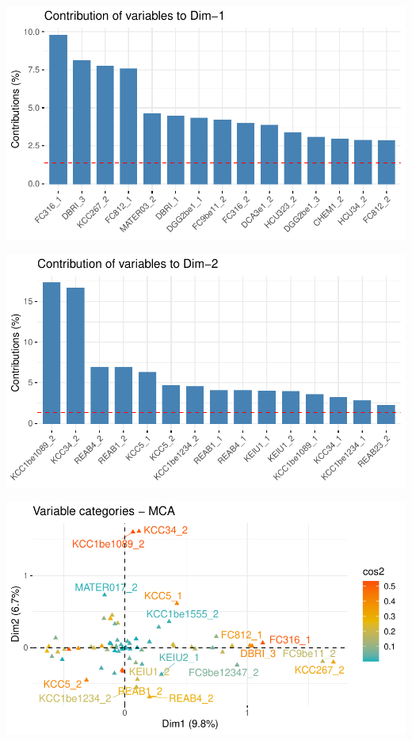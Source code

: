 \documentclass[11pt,a4paper, x11names]{article}\usepackage[]{graphicx}\usepackage[]{color}
\makeatletter
\def\maxwidth{ %
  \ifdim\Gin@nat@width>\linewidth
    \linewidth
  \else
    \Gin@nat@width
  \fi
}
\newenvironment{knitrout}{}{} %
\makeatother
\begin{document}
\vfill
\begin{minipage}{0.49\linewidth}
\begin{mdframed}
\begin{knitrout}
\color{fgcolor}
\includegraphics[width=\maxwidth]{figure/unnamed-chunk-13-1} 

\includegraphics[width=\maxwidth]{figure/unnamed-chunk-13-2} 
\end{knitrout}
\end{mdframed}
\end{minipage}
\hfill
\begin{minipage}{0.49\linewidth}
\begin{mdframed}
\begin{knitrout}
\color{fgcolor}
\includegraphics[width=\maxwidth]{figure/unnamed-chunk-14-1} 
\end{knitrout}
\end{mdframed}
\end{minipage}
\end{document}
